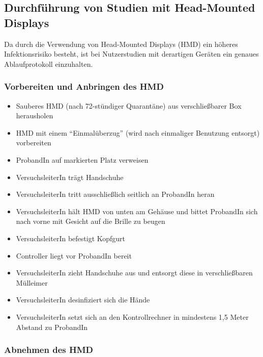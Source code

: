 \subsection{Durchführung von Studien mit Head-Mounted Displays}\label{subsec:nutzerstudien_hmd}

Da durch die Verwendung von Head-Mounted Displays (HMD) ein höheres Infektionsrisiko besteht, ist bei Nutzerstudien mit derartigen Geräten ein genaues Ablaufprotokoll einzuhalten.

\subsubsection*{Vorbereiten und Anbringen des HMD}

{
\singlespacing
\begin{itemize}
    \item Sauberes HMD (nach 72-stündiger Quarantäne) aus verschließbarer Box herausholen
    \item HMD mit einem “Einmalüberzug” (wird nach einmaliger Benutzung entsorgt) vorbereiten
    \item ProbandIn auf markierten Platz verweisen 
    \item VersuchsleiterIn trägt Handschuhe
    \item VersuchsleiterIn tritt ausschließlich seitlich an ProbandIn heran
    \item VersuchsleiterIn hält HMD von unten am Gehäuse und bittet ProbandIn sich nach vorne mit Gesicht auf die Brille zu beugen 
    \item VersuchsleiterIn befestigt Kopfgurt 
    \item Controller liegt vor ProbandIn bereit 
    \item VersuchsleiterIn zieht Handschuhe aus und entsorgt diese in verschließbaren Mülleimer
    \item VersuchsleiterIn desinfiziert sich die Hände
    \item VersuchsleiterIn setzt sich an den Kontrollrechner in mindestens 1,5 Meter Abstand zu ProbandIn
\end{itemize}
}

\subsubsection*{Abnehmen des HMD}

